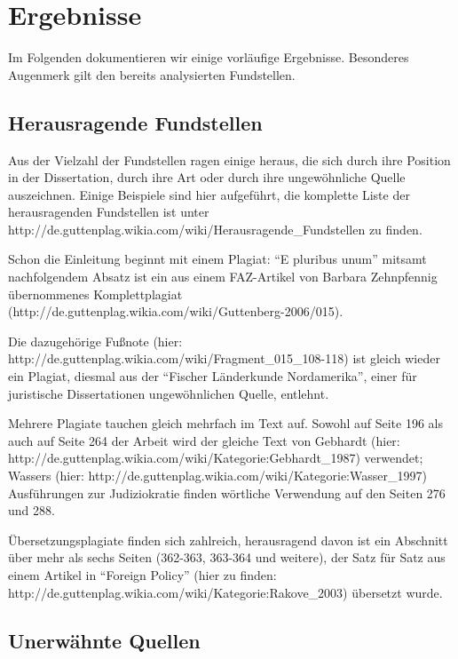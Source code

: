 \documentclass[ngerman,final,fontsize=12pt,paper=a4,twoside,BCOR=8mm,draft=false]{scrartcl}
\begin{document}
\section{Ergebnisse}
Im Folgenden dokumentieren wir einige vorläufige Ergebnisse. Besonderes Augenmerk gilt den bereits analysierten Fundstellen.

\subsection{Herausragende Fundstellen}
Aus der Vielzahl der Fundstellen ragen einige heraus, die sich durch ihre Position in der Dissertation, durch ihre Art oder durch ihre ungewöhnliche Quelle auszeichnen. Einige Beispiele sind hier aufgeführt, die komplette Liste der herausragenden Fundstellen ist unter http://de.guttenplag.wikia.com/wiki/Herausragende\_Fundstellen zu finden. 

Schon die Einleitung beginnt mit einem Plagiat: "`E pluribus unum"' mitsamt nachfolgendem Absatz ist ein aus einem FAZ-Artikel von Barbara Zehnpfennig übernommenes Komplettplagiat (http://de.guttenplag.wikia.com/wiki/Guttenberg-2006/015). 

Die dazugehörige Fußnote (hier: http://de.guttenplag.wikia.com/wiki/Fragment\_015\_108-118) ist gleich wieder ein Plagiat, diesmal aus der "`Fischer Länderkunde Nordamerika"', einer für juristische Dissertationen ungewöhnlichen Quelle, entlehnt. 

Mehrere Plagiate tauchen gleich mehrfach im Text auf. Sowohl auf Seite 196 als auch auf Seite 264 der Arbeit wird der gleiche Text von Gebhardt (hier: http://de.guttenplag.wikia.com/wiki/Kategorie:Gebhardt\_1987) verwendet; Wassers (hier: http://de.guttenplag.wikia.com/wiki/Kategorie:Wasser\_1997) Ausführungen zur Judiziokratie finden wörtliche Verwendung auf den Seiten 276 und 288. 

Übersetzungsplagiate finden sich zahlreich, herausragend davon ist ein Abschnitt über mehr als sechs Seiten (362-363, 363-364 und weitere), der Satz für Satz aus einem Artikel in "`Foreign Policy"' (hier zu finden: http://de.guttenplag.wikia.com/wiki/Kategorie:Rakove\_2003) übersetzt wurde.

\subsection{Unerwähnte Quellen}
\end{document}
